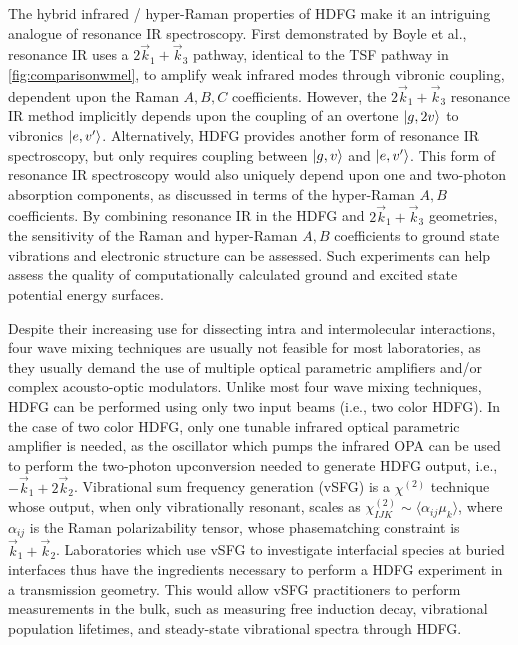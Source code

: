 \documentclass[aip, jcp, reprint, twocolumn]{revtex4-2}
\begin{document}
The hybrid infrared / hyper-Raman properties of HDFG make it an intriguing analogue of resonance IR spectroscopy.
First demonstrated by Boyle et al., resonance IR uses a $2\vec{k}_1 + \vec{k}_3$ pathway, identical to the TSF pathway in \autoref{fig:comparisonwmel}, to amplify weak infrared modes through vibronic coupling, dependent upon the Raman $A,B,C$ coefficients. \cite{RN491}
However, the $2\vec{k}_1 + \vec{k}_3$ resonance IR method implicitly depends upon the coupling of an overtone $\ket{g,2v}$ to vibronics $\ket{e,v'}$.
Alternatively, HDFG provides another form of resonance IR spectroscopy, but only requires coupling between $\ket{g,v}$ and $\ket{e,v'}$.
This form of resonance IR spectroscopy would also uniquely depend upon one and two-photon absorption components, as discussed in terms of the hyper-Raman $A,B$ coefficients.
By combining resonance IR in the HDFG and $2\vec{k}_1 + \vec{k}_3$ geometries, the sensitivity of the Raman and hyper-Raman $A,B$ coefficients to ground state vibrations and electronic structure can be assessed. 
Such experiments can help assess the quality of computationally calculated ground and excited state potential energy surfaces. 

Despite their increasing use for dissecting intra and intermolecular interactions, four wave mixing techniques are usually not feasible for most laboratories, as they usually demand the use of multiple optical parametric amplifiers and/or complex acousto-optic modulators. 
Unlike most four wave mixing techniques, HDFG can be performed using only two input beams (i.e., two color HDFG).
In the case of two color HDFG, only one tunable infrared optical parametric amplifier is needed, as the oscillator which pumps the infrared OPA can be used to perform the two-photon upconversion needed to generate HDFG output, i.e., $-\vec{k}_1 + 2\vec{k}_2$.
Vibrational sum frequency generation (vSFG) is a $\chi^{(2)}$ technique whose output, when only vibrationally resonant, scales as $\chi^{(2)}_{IJK} \sim \langle \alpha_{ij} \mu_k \rangle$, where $\alpha_{ij}$ is the Raman polarizability tensor, whose phasematching constraint is  $\vec{k}_1 + \vec{k}_2$.
Laboratories which use vSFG to investigate interfacial species at buried interfaces thus have the ingredients necessary to perform a HDFG experiment in a transmission geometry. \cite{Piontek2023_1}
This would allow vSFG practitioners to perform measurements in the bulk, such as measuring free induction decay, vibrational population lifetimes, and steady-state vibrational spectra through HDFG.
 
\end{document}
